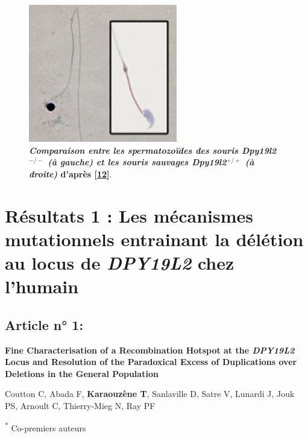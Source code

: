 \documentclass[12pt,twoside]{ugathesis}
\begin{document}
\begin{figure}

{\centering \includegraphics[scale=0.8]{figure/mouse_globo_spz} 

}

\caption[Comparaison entre les spermatozoïdes des souris *Dpy19l2*$^{-/-}$ (à gauche) et les souris sauvages *Dpy19l2*$^{+/+}$ (à droite)]{\textbf{\emph{Comparaison entre les spermatozoïdes
des souris \emph{Dpy19l2}\(^{-/-}\) (à gauche) et les souris sauvages
\emph{Dpy19l2}\(^{+/+}\) (à droite)} d'après
{[}\protect\hyperlink{ref-Pierre2012}{12}{]}}.}\label{fig:pictmouseglobo}
\end{figure}






\newpage

\section{\texorpdfstring{Résultats 1 : Les mécanismes mutationnels
entrainant la délétion au locus de \emph{DPY19L2} chez
l'humain}{Résultats 1 : Les mécanismes mutationnels entrainant la délétion au locus de DPY19L2 chez l'humain}}\label{mecamut}

\subsection{Article n° 1:}\label{article-n-1}

\textbf{Fine Characterisation of a Recombination Hotspot at the
\emph{DPY19L2} Locus and Resolution of the Paradoxical Excess of
Duplications over Deletions in the General Population}

Coutton C, Abada F, \textbf{Karaouzène T}, Sanlaville D, Satre V,
Lunardi J, Jouk PS, Arnoult C, Thierry-Mieg N, Ray PF

\textsuperscript{*} Co-premiers auteurs
\end{document}
